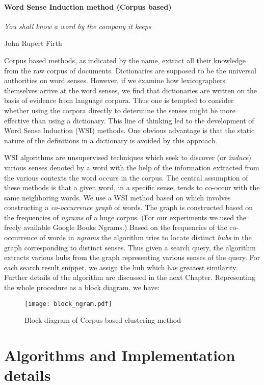 \documentclass[a4paper,12pt]{report}
\begin{document}
\subsubsection{Word Sense Induction method (Corpus based)}

\epigraph{{\it You shall know a word by the company it keeps}}{John Rupert Firth}

Corpus based methods, as indicated by the name, extract all their
knowledge from the raw corpus of documents. Dictionaries are supposed
to be the universal authorities on word senses. However, if we examine
how lexicographers themselves arrive at the word senses, we find that
dictionaries are written on the basis of evidence from language
corpora. Thus one is tempted to consider whether using the corpora
directly to determine the senses might be more effective than using a
dictionary. This line of thinking led to the development of Word Sense
Induction (WSI) methods. One obvious advantage is that the static
nature of the definitions in a dictionary is avoided by this approach.

WSI algorithms are unsupervised techniques which seek to discover (or
{\it induce}) various senses denoted by a word with the help of the
information extracted from the various contexts the word occurs in the
corpus. The central assumption of these methods is that a given word,
in a specific sense, tends to co-occur with the same neighboring
words. We use a WSI method based on \cite{navigli} which involves
constructing a {\it co-occurrence graph} of words. The graph is
constructed based on the frequencies of {\it ngrams} of a huge
corpus. (For our experiments we used the freely available Google Books
Ngrams.) Based on the frequencies of the co-occurrence of words in
{\it ngrams} the algorithm tries to locate distinct {\it hubs} in the
graph corresponding to distinct senses. Thus given a search query, the
algorithm extracts various hubs from the graph representing various
senses of the query. For each search result snippet, we assign the hub
which has greatest similarity. Further details of the algorithm are
discussed in the next Chapter. Representing the whole procedure as a
block diagram, we have:
\begin{figure}[h]
  \centering
  \texttt{[image: block\_ngram.pdf]}
  \caption{Block diagram of Corpus based clustering method}
\end{figure}

\chapter{Algorithms and Implementation details}
\end{document}
